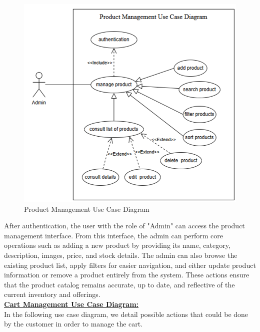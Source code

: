 \begin{figure}[!h]
\begin{center}
\includegraphics[width=13cm]{images/Product Management Use Case Diagram.png}
\end{center}
\caption{Product Management Use Case Diagram}
\end{figure}

After authentication, the user with the role of "Admin" can access the product management interface. From this interface, the admin can perform core operations such as adding a new product by providing its name, category, description, images, price, and stock details. The admin can also browse the existing product list, apply filters for easier navigation, and either update product information or remove a product entirely from the system. These actions ensure that the product catalog remains accurate, up to date, and reflective of the current inventory and offerings.\\

\underline{\textbf{Cart Management Use Case Diagram:}}\\

In the following use case diagram, we detail possible actions that could be done by the customer in order to manage the cart.\\

